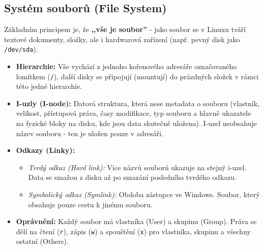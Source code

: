 \subsection{Systém souborů (File System)}
Základním principem je, že \textbf{,,vše je soubor''} - jako soubor se v Linuxu tváří textové dokumenty, složky, ale i hardwarová zařízení (např. pevný disk jako \texttt{/dev/sda}).
\begin{itemize}
    \item \textbf{Hierarchie:} Vše vychází z jednoho kořenového adresáře označovaného lomítkem (\texttt{/}), další disky se připojují (mountují) do prázdných složek v rámci této jedné hierarchie.
    \item \textbf{I-uzly (I-node):} Datová struktura, která nese metadata o souboru (vlastník, velikost, přístupová práva, časy modifikace, typ souboru a hlavně ukazatele na fyzické bloky na disku, kde jsou data skutečně uložena). I-uzel neobsahuje název souboru - ten je uložen pouze v adresáři.
    \item \textbf{Odkazy (Linky):}
    \begin{itemize}
        \item \textit{Tvrdý odkaz (Hard link):} Více názvů souborů ukazuje na stejný i-uzel. Data se smažou z disku až po smazání posledního tvrdého odkazu.
        \item \textit{Symbolický odkaz (Symlink):} Obdoba zástupce ve Windows. Soubor, který obsahuje pouze cestu k jinému souboru.
    \end{itemize}
    \item \textbf{Oprávnění:} Každý soubor má vlastníka (User) a skupinu (Group). Práva se dělí na čtení (\texttt{r}), zápis (\texttt{w}) a spouštění (\texttt{x}) pro vlastníka, skupinu a všechny ostatní (Others).
\end{itemize}
